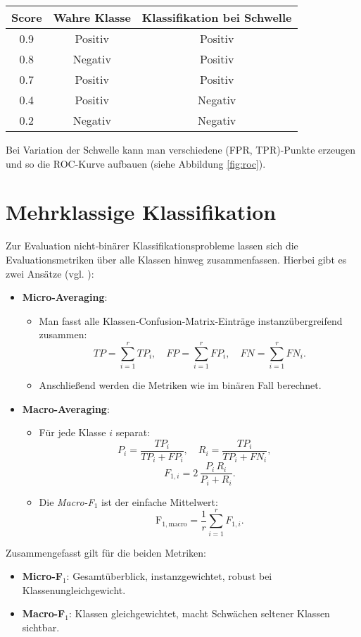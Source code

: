 \begin{center}
\begin{tabular}{|c|c|c|}
\hline
Score & Wahre Klasse & Klassifikation bei Schwelle \\
\hline
0.9 & Positiv & Positiv \\
0.8 & Negativ & Positiv \\
0.7 & Positiv & Positiv \\
0.4 & Positiv & Negativ \\
0.2 & Negativ & Negativ \\
\hline
\end{tabular}
\end{center}

Bei Variation der Schwelle kann man verschiedene (FPR, TPR)-Punkte erzeugen und so die ROC-Kurve aufbauen (siehe Abbildung \ref{fig:roc}).

\section{Mehrklassige Klassifikation}

Zur Evaluation nicht‑binärer Klassifikationsprobleme lassen sich die Evaluationsmetriken über alle Klassen hinweg zusammenfassen.
Hierbei gibt es zwei Ansätze (vgl. \cite{takahashi2022confidence}):

\begin{itemize}
  \item \textbf{Micro-Averaging}:  
    \begin{itemize}
      \item Man fasst alle Klassen‑Confusion‑Matrix‑Einträge instanzübergreifend zusammen:
      \[
        TP = \sum_{i=1}^r TP_i,\quad
        FP = \sum_{i=1}^r FP_i,\quad
        FN = \sum_{i=1}^r FN_i.
      \]
      \item Anschließend werden die Metriken wie im binären Fall berechnet.
    \end{itemize}

  \item \textbf{Macro-Averaging}:  
    \begin{itemize}
      \item Für jede Klasse \(i\) separat:
      \[
        P_i = \frac{TP_i}{TP_i + FP_i},\quad
        R_i = \frac{TP_i}{TP_i + FN_i},\quad
      \]
      \[
        F_{1,i} = 2\,\frac{P_i\,R_i}{P_i + R_i}.
      \]
      \item Die \emph{Macro-F\(_1\)} ist der einfache Mittelwert:
      \[
        \mathrm{F}_{1,\text{macro}}
        = \frac{1}{r} \sum_{i=1}^r F_{1,i}.
      \]
    \end{itemize}
\end{itemize}

Zusammengefasst gilt für die beiden Metriken:
\begin{itemize}
  \item \textbf{Micro-F\(_1\)}: Gesamtüberblick, instanzgewichtet, robust bei Klassenungleichgewicht.
  \item \textbf{Macro-F\(_1\)}: Klassen gleichgewichtet, macht Schwächen seltener Klassen sichtbar.
\end{itemize}
